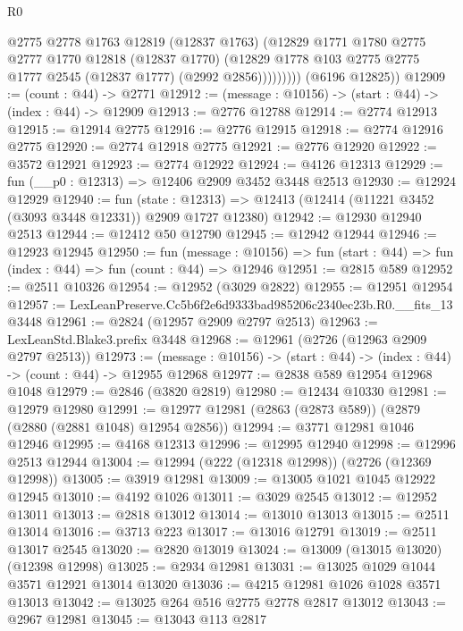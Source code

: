 \begin{lexlean}{R0}
\begin{coremodule}
                  @2775
                  @2778
                  @1763
                  @12819
                  (@12837 @1763)
                  (@12829
                    @1771
                    @1780
                    @2775
                    @2777
                    @1770
                    @12818
                    (@12837 @1770)
                    (@12829 @1778 @103 @2775 @2775 @1777 @2545 (@12837 @1777) (@2992 @2856)))))))))
      (@6196 @12825))
@12909 := (count : @44) -> @2771
@12912 := (message : @10156) -> (start : @44) -> (index : @44) -> @12909
@12913 := @2776 @12788
@12914 := @2774 @12913
@12915 := @12914 @2775
@12916 := @2776 @12915
@12918 := @2774 @12916 @2775
@12920 := @2774 @12918 @2775
@12921 := @2776 @12920
@12922 := @3572 @12921
@12923 := @2774 @12922
@12924 := @4126 @12313
@12929 := fun (__p0 : @12313) => @12406 @2909 @3452 @3448 @2513
@12930 := @12924 @12929
@12940 := fun (state : @12313) =>
  @12413 (@12414 (@11221 @3452 (@3093 @3448 @12331)) @2909 @1727 @12380)
@12942 := @12930 @12940 @2513
@12944 := @12412 @50 @12790
@12945 := @12942 @12944
@12946 := @12923 @12945
@12950 := fun (message : @10156) =>
  fun (start : @44) => fun (index : @44) => fun (count : @44) => @12946
@12951 := @2815 @589
@12952 := @2511 @10326
@12954 := @12952 (@3029 @2822)
@12955 := @12951 @12954
@12957 := LexLeanPreserve.Cc5b6f2e6d9333bad985206c2340ec23b.R0.__fits_13 @3448
@12961 := @2824 (@12957 @2909 @2797 @2513)
@12963 := LexLeanStd.Blake3.prefix @3448
@12968 := @12961 (@2726 (@12963 @2909 @2797 @2513))
@12973 := (message : @10156) -> (start : @44) -> (index : @44) -> (count : @44) -> @12955 @12968
@12977 := @2838 @589 @12954 @12968 @1048
@12979 := @2846 (@3820 @2819)
@12980 := @12434 @10330
@12981 := @12979 @12980
@12991 := @12977 @12981 (@2863 (@2873 @589)) (@2879 (@2880 (@2881 @1048) @12954 @2856))
@12994 := @3771 @12981 @1046 @12946
@12995 := @4168 @12313
@12996 := @12995 @12940
@12998 := @12996 @2513 @12944
@13004 := @12994 (@222 (@12318 @12998)) (@2726 (@12369 @12998))
@13005 := @3919 @12981
@13009 := @13005 @1021 @1045 @12922 @12945
@13010 := @4192 @1026
@13011 := @3029 @2545
@13012 := @12952 @13011
@13013 := @2818 @13012
@13014 := @13010 @13013
@13015 := @2511 @13014
@13016 := @3713 @223
@13017 := @13016 @12791
@13019 := @2511 @13017 @2545
@13020 := @2820 @13019
@13024 := @13009 (@13015 @13020) (@12398 @12998)
@13025 := @2934 @12981
@13031 := @13025 @1029 @1044 @3571 @12921 @13014 @13020
@13036 := @4215 @12981 @1026 @1028 @3571 @13013
@13042 := @13025 @264 @516 @2775 @2778 @2817 @13012
@13043 := @2967 @12981
@13045 := @13043 @113 @2817

\end{coremodule}
\end{lexlean}

